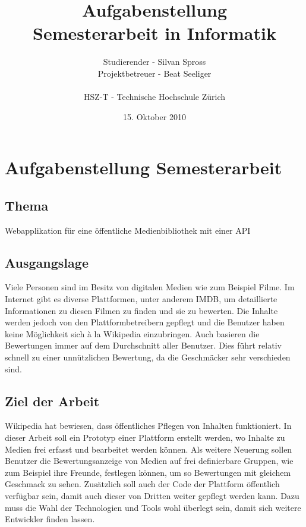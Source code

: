 \documentclass[]{scrreprt}
\title{Aufgabenstellung\\
    Semesterarbeit in Informatik}
\author{Studierender - Silvan Spross\\
    Projektbetreuer - Beat Seeliger\\
    \\
    HSZ-T - Technische Hochschule Zürich}
\date{15. Oktober 2010}
\begin{document}
    \ifpdf
    \else
    \fi

    \maketitle



    \chapter{Aufgabenstellung Semesterarbeit}

    \section{Thema}
    Webapplikation für eine öffentliche Medienbibliothek mit einer 
    API

    \section{Ausgangslage}
    Viele Personen sind im Besitz von digitalen Medien wie zum Beispiel Filme.
    Im Internet gibt es diverse Plattformen, unter anderem IMDB, um 
    detaillierte Informationen zu diesen Filmen zu finden und sie zu bewerten. 
    Die Inhalte werden jedoch von den Plattformbetreibern gepflegt und die 
    Benutzer haben keine Möglichkeit sich à la Wikipedia einzubringen. Auch 
    basieren die Bewertungen immer auf dem Durchschnitt aller Benutzer. Dies
    führt relativ schnell zu einer unnützlichen Bewertung, da die Geschmäcker
    sehr verschieden sind.

    \section{Ziel der Arbeit}
    Wikipedia hat bewiesen, dass öffentliches Pflegen von Inhalten 
    funktioniert. In dieser Arbeit soll ein Prototyp einer Plattform erstellt
    werden, wo Inhalte zu Medien frei erfasst und bearbeitet werden können.
    Als weitere Neuerung sollen Benutzer die Bewertungsanzeige von Medien auf
    frei definierbare Gruppen, wie zum Beispiel ihre Freunde, festlegen 
    können, um so Bewertungen mit gleichem Geschmack zu sehen. Zusätzlich soll 
    auch der Code der Plattform öffentlich verfügbar sein, damit auch dieser 
    von Dritten weiter gepflegt werden kann. Dazu muss die Wahl der
    Technologien und Tools wohl überlegt sein, damit sich weitere Entwickler
    finden lassen.
\end{document}
